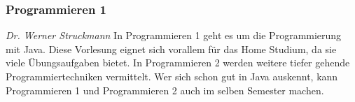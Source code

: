 
\subsubsection{Programmieren 1}
	\textit{Dr. Werner Struckmann}
	In Programmieren 1 geht es um die Programmierung mit Java. Diese Vorlesung eignet sich vorallem für das Home Studium, da sie viele Übungsaufgaben bietet. In Programmieren 2 werden weitere tiefer gehende Programmiertechniken vermittelt. Wer sich schon gut in Java auskennt, kann Programmieren 1 und Programmieren 2 auch im selben Semester machen.